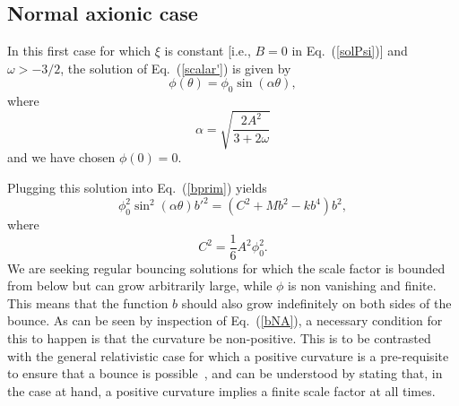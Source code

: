 \documentclass[a4paper,aps,twocolumn,prd,showpacs,nofootinbib]{revtex4}
\begin{document}
\subsection{Normal axionic case}

In this first case for which $\xi$ is constant [i.e., $B=0$ in
Eq.~(\ref{solPsi})] and $\omega > -3/2$, the solution of
Eq.~(\ref{scalar'}) is given by
\begin{equation}
\phi(\theta) = \phi_0\sin(\alpha\theta),\label{phiNA}
\end{equation}
where
\begin{equation}
\alpha = \sqrt{\frac{2A^2}{3 + 2\omega}}
\end{equation}
and we have chosen $\phi (0)=0$.

Plugging this solution into Eq.~(\ref{bprim}) yields
\begin{equation}
\phi_0^2 \sin^2(\alpha\theta) b'^2 = (C^2 + M b^2 - k b^4 ) b^2,
\label{bNA}
\end{equation}
where 
\begin{equation} 
C^2 = \frac{1}{6}A^2\phi_0^2.\label{C}
\end{equation}
We are seeking regular bouncing solutions for which the scale factor
is bounded from below but can grow arbitrarily large, while $\phi$ is
non vanishing and finite. This means that the function $b$ should also
grow indefinitely on both sides of the bounce. As can be seen by
inspection of Eq.~(\ref{bNA}), a necessary condition for this to
happen is that the curvature be non-positive. This is to be contrasted
with the general relativistic case for which a positive curvature is a
pre-requisite to ensure that a bounce is possible~\cite{ppnpn1}, and
can be understood by stating that, in the case at hand, a positive
curvature implies a finite scale factor at all times.
\end{document}
